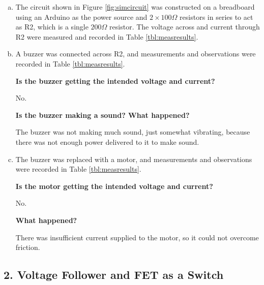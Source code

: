 \documentclass[12pt]{article}
\begin{document}
\begin{enumerate}[a.]
    \item The circuit shown in Figure \ref{fig:simcircuit} was constructed on a breadboard using an
        Arduino as the power source and $2\times 100 \Omega$ resistors in series to act as R2, which
        is a single $200\Omega$ resistor. The voltage across and current through R2 were measured 
        and recorded in Table \ref{tbl:measresults}.
    \item A buzzer was connected across R2, and measurements and observations were recorded in 
        Table \ref{tbl:measresults}.

        \textbf{Is the buzzer getting the intended voltage and current?}

        No.

        \textbf{Is the buzzer making a sound? What happened?}
        
        The buzzer was not making much sound, just somewhat vibrating, because there was not enough 
        power delivered to it to make sound.

    \item The buzzer was replaced with a motor, and measurements and observations were recorded in 
        Table \ref{tbl:measresults}. 

        \textbf{Is the motor getting the intended voltage and current?}

        No.

        \textbf{What happened?}

        There was insufficient current supplied to the motor, so it could not overcome friction. 

\end{enumerate}

\subsection*{2. Voltage Follower and FET as a Switch}
\end{document}

